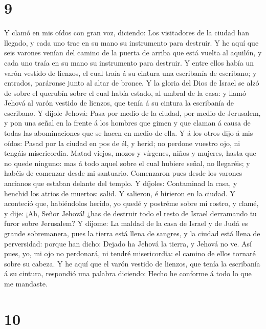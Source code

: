 \hypertarget{section-8}{%
\section{9}\label{section-8}}

 Y clamó en mis oídos con gran voz, diciendo: Los
visitadores de la ciudad han llegado, y cada uno trae en su mano su
instrumento para destruir.  Y he aquí que seis varones
venían del camino de la puerta de arriba que está vuelta al aquilón, y
cada uno traía en su mano su instrumento para destruir. Y entre ellos
había un varón vestido de lienzos, el cual traía á su cintura una
escribanía de escribano; y entrados, paráronse junto al altar de bronce.
 Y la gloria del Dios de Israel se alzó de sobre el
querubín sobre el cual había estado, al umbral de la casa: y llamó
Jehová al varón vestido de lienzos, que tenía á su cintura la escribanía
de escribano.  Y díjole Jehová: Pasa por medio de la
ciudad, por medio de Jerusalem, y pon una señal en la frente á los
hombres que gimen y que claman á causa de todas las abominaciones que se
hacen en medio de ella.  Y á los otros dijo á mis oídos:
Pasad por la ciudad en pos de él, y herid; no perdone vuestro ojo, ni
tengáis misericordia.  Matad viejos, mozos y vírgenes,
niños y mujeres, hasta que no quede ninguno: mas á todo aquel sobre el
cual hubiere señal, no llegaréis; y habéis de comenzar desde mi
santuario. Comenzaron pues desde los varones ancianos que estaban
delante del templo.  Y díjoles: Contaminad la casa, y
henchid los atrios de muertos: salid. Y salieron, é hirieron en la
ciudad.  Y aconteció que, habiéndolos herido, yo quedé y
postréme sobre mi rostro, y clamé, y dije: ¡Ah, Señor Jehová! ¿has de
destruir todo el resto de Israel derramando tu furor sobre Jerusalem?
 Y díjome: La maldad de la casa de Israel y de Judá es
grande sobremanera, pues la tierra está llena de sangres, y la ciudad
está llena de perversidad: porque han dicho: Dejado ha Jehová la tierra,
y Jehová no ve.  Así pues, yo, mi ojo no perdonará, ni
tendré misericordia: el camino de ellos tornaré sobre su cabeza.
 Y he aquí que el varón vestido de lienzos, que tenía la
escribanía á su cintura, respondió una palabra diciendo: Hecho he
conforme á todo lo que me mandaste.

\hypertarget{section-9}{%
\section{10}\label{section-9}}

